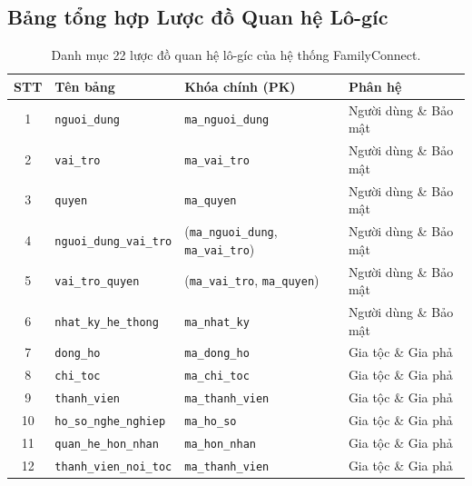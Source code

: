 \subsection{Bảng tổng hợp Lược đồ Quan hệ Lô-gíc}
\label{subsec:2_2_5_tong_hop}

\begin{table}[htbp]
\centering
\small
\caption{Danh mục 22 lược đồ quan hệ lô-gíc của hệ thống FamilyConnect.}
\label{tab:relational_schemas_all}
\begin{tabularx}{\textwidth}{|c|l|p{4.2cm}|X|}
\hline
\textbf{STT} & \textbf{Tên bảng} & \textbf{Khóa chính (PK)} & \textbf{Phân hệ} \\ \hline
1  & \texttt{nguoi\_dung}         & \texttt{ma\_nguoi\_dung}         & Người dùng \& Bảo mật \\ \hline
2  & \texttt{vai\_tro}            & \texttt{ma\_vai\_tro}            & Người dùng \& Bảo mật \\ \hline
3  & \texttt{quyen}               & \texttt{ma\_quyen}               & Người dùng \& Bảo mật \\ \hline
4  & \texttt{nguoi\_dung\_vai\_tro} & (\texttt{ma\_nguoi\_dung}, \texttt{ma\_vai\_tro}) & Người dùng \& Bảo mật \\ \hline
5  & \texttt{vai\_tro\_quyen}     & (\texttt{ma\_vai\_tro}, \texttt{ma\_quyen})       & Người dùng \& Bảo mật \\ \hline
6  & \texttt{nhat\_ky\_he\_thong} & \texttt{ma\_nhat\_ky}            & Người dùng \& Bảo mật \\ \hline
7  & \texttt{dong\_ho}            & \texttt{ma\_dong\_ho}            & Gia tộc \& Gia phả \\ \hline
8  & \texttt{chi\_toc}            & \texttt{ma\_chi\_toc}            & Gia tộc \& Gia phả \\ \hline
9  & \texttt{thanh\_vien}         & \texttt{ma\_thanh\_vien}         & Gia tộc \& Gia phả \\ \hline
10 & \texttt{ho\_so\_nghe\_nghiep}& \texttt{ma\_ho\_so}              & Gia tộc \& Gia phả \\ \hline
11 & \texttt{quan\_he\_hon\_nhan} & \texttt{ma\_hon\_nhan}           & Gia tộc \& Gia phả \\ \hline
12 & \texttt{thanh\_vien\_noi\_toc}& \texttt{ma\_thanh\_vien}         & Gia tộc \& Gia phả \\ \hline

\end{tabularx}
\end{table}
